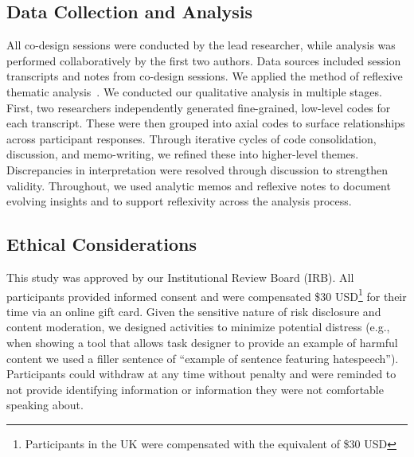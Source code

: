 \subsection{Data Collection and Analysis}
All co-design sessions were conducted by the lead researcher, while analysis was performed collaboratively by the first two authors. Data sources included session transcripts and notes from co-design sessions. We applied the method of reflexive thematic analysis~\cite{clarke2017thematic, smith1995semi}. We conducted our qualitative analysis in multiple stages. First, two researchers independently generated fine-grained, low-level codes for each transcript. These were then grouped into axial codes to surface relationships across participant responses. Through iterative cycles of code consolidation, discussion, and memo-writing, we refined these into higher-level themes. Discrepancies in interpretation were resolved through discussion to strengthen validity. Throughout, we used analytic memos and reflexive notes to document evolving insights and to support reflexivity across the analysis process.


\subsection{Ethical Considerations}
This study was approved by our Institutional Review Board (IRB). All participants provided informed consent and were compensated \$30 USD\footnote{Participants in the UK were compensated with the equivalent of \$30 USD} for their time via an online gift card. Given the sensitive nature of risk disclosure and content moderation, we designed activities to minimize potential distress (e.g., when showing a tool that allows task designer to provide an example of harmful content we used a filler sentence of ``example of sentence featuring hatespeech''). Participants could withdraw at any time without penalty and were reminded to not provide identifying information or information they were not comfortable speaking about. 